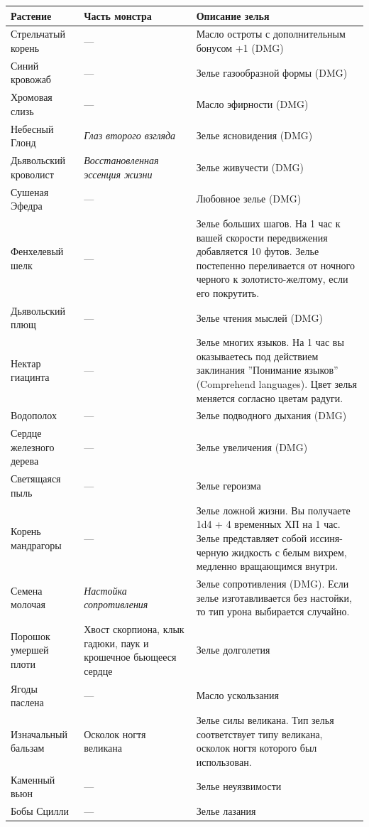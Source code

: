\documentclass[a4paper, 9pt, twocolumn]{book}
\begin{document}
	\begin{tabular}{|m{3cm}|m{4cm}|m{10cm}|}
		\hline
		\textbf{Растение} & \textbf{Часть монстра} & \textbf{Описание зелья} \\
		\hline
		Стрельчатый корень & --- & Масло остроты с дополнительным бонусом +1 (DMG) \\
		\hline
		Синий кровожаб & --- & Зелье газообразной формы (DMG) \\
		\hline
		Хромовая слизь & --- &  Масло эфирности (DMG) \\
		\hline
		Небесный Глонд & \textit{Глаз второго взгляда} & Зелье ясновидения (DMG) \\
		\hline
		Дьявольский кроволист & \textit{Восстановленная эссенция жизни} & Зелье живучести (DMG) \\
		\hline
		Сушеная Эфедра & --- & Любовное зелье (DMG) \\
		\hline
		Фенхелевый шелк & --- & Зелье больших шагов. На 1 час к вашей скорости передвижения добавляется 10 футов. Зелье постепенно переливается от ночного черного к золотисто-желтому, если его покрутить. \\
		\hline
		Дьявольский плющ & --- & Зелье чтения мыслей (DMG) \\
		\hline
		Нектар гиацинта & --- & Зелье многих языков. На 1 час вы оказываетесь под действием заклинания ''Понимание языков'' (Comprehend languages). Цвет зелья меняется согласно цветам радуги. \\
		\hline
		Водополох & --- & Зелье подводного дыхания (DMG) \\
		\hline
		Сердце железного дерева & --- & Зелье увеличения (DMG) \\
		\hline
		Светящаяся пыль & --- & Зелье героизма \\
		\hline
		Корень мандрагоры & --- & Зелье ложной жизни. Вы получаете 1d4 + 4 временных ХП на 1 час. Зелье представляет собой иссиня-черную жидкость с белым вихрем, медленно вращающимся внутри.\\
		\hline
		Семена молочая & \textit{Настойка сопротивления} &  Зелье сопротивления (DMG). Если зелье изготавливается без настойки, то тип урона выбирается случайно.\\
		\hline
		Порошок умершей плоти & Хвост скорпиона, клык гадюки, паук и крошечное бьющееся сердце & Зелье долголетия \\
		\hline
		Ягоды паслена & --- & Масло ускользания  \\
		\hline
		Изначальный бальзам & Осколок ногтя великана & Зелье силы великана. Тип зелья соответствует типу великана, осколок ногтя которого был использован. \\
		\hline
		Каменный вьюн & --- & Зелье неуязвимости \\
		\hline
		Бобы Сцилли & --- & Зелье лазания \\
		\hline
	\end{tabular}
\end{document}
